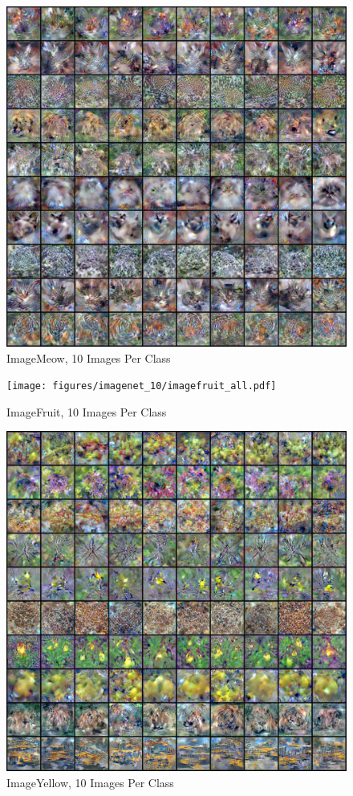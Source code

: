 \documentclass[main.tex]{subfiles}
\begin{document}
\begin{figure}
    \centering
    \includegraphics[width=\linewidth]{figures/imagenet_10/imagemeow_all.pdf}
    \caption{ImageMeow, 10 Images Per Class}
    \label{fig:meow_10}
\end{figure}
\begin{figure}
    \centering
    \texttt{[image: figures/imagenet\_10/imagefruit\_all.pdf]}
    \caption{ImageFruit, 10 Images Per Class}
    \label{fig:fruit_10}
\end{figure}
\begin{figure}
    \centering
    \includegraphics[width=\linewidth]{figures/imagenet_10/imageyellow_all.pdf}
    \caption{ImageYellow, 10 Images Per Class}
    \label{fig:yellow_10}
\end{figure}
\vfill\break
\end{document}
